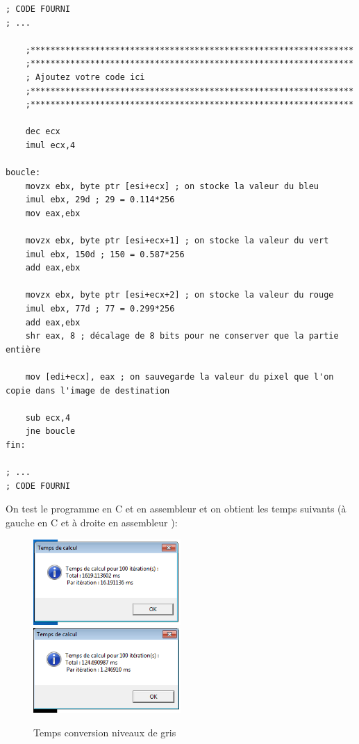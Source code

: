 \assembly
\begin{lstlisting}
; CODE FOURNI
; ...

    ;*****************************************************************
    ;*****************************************************************
    ; Ajoutez votre code ici
    ;*****************************************************************
    ;*****************************************************************
    
    dec ecx
    imul ecx,4

boucle: 
    movzx ebx, byte ptr [esi+ecx] ; on stocke la valeur du bleu
    imul ebx, 29d ; 29 = 0.114*256
    mov eax,ebx

    movzx ebx, byte ptr [esi+ecx+1] ; on stocke la valeur du vert
    imul ebx, 150d ; 150 = 0.587*256
    add eax,ebx

    movzx ebx, byte ptr [esi+ecx+2] ; on stocke la valeur du rouge
    imul ebx, 77d ; 77 = 0.299*256
    add eax,ebx
    shr eax, 8 ; décalage de 8 bits pour ne conserver que la partie entière

    mov [edi+ecx], eax ; on sauvegarde la valeur du pixel que l'on copie dans l'image de destination

    sub ecx,4
    jne boucle
fin:

; ...
; CODE FOURNI
\end{lstlisting}

On test le programme en C et en assembleur et on obtient les temps suivants (à gauche en C et à droite en assembleur ):
\begin{figure}[!h]
   \includegraphics[width=0.5\textwidth]{img/gris_c.png}
   \includegraphics[width=0.5\textwidth]{img/gris_assembly.png}
   \caption{Temps conversion niveaux de gris}
\end{figure}

